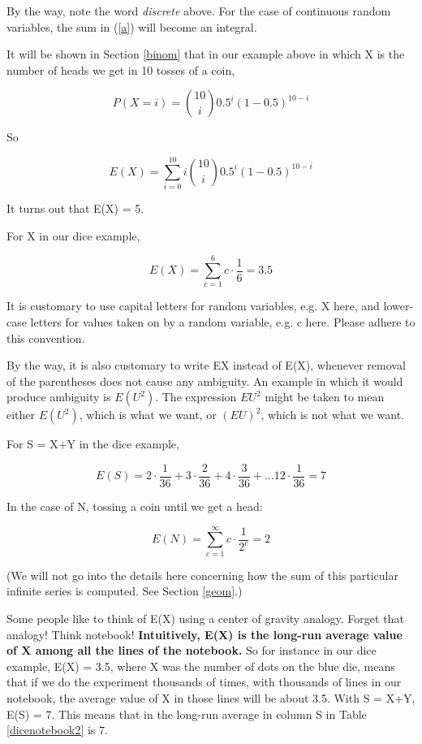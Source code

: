 By the way, note the word {\it discrete} above.  For the case of
continuous random variables, the sum in (\ref{a}) will become an
integral.

It will be shown in Section \ref{binom} that in our example above in
which X is the number of heads we get in 10 tosses of a coin,

\begin{equation}
P(X = i) =  \binom{10}{i} 0.5^i (1-0.5)^{10-i}  
\end{equation}

So

\begin{equation}
E(X) =  \sum_{i=0}^{10} i \binom{10}{i} 0.5^i (1-0.5)^{10-i}  
\end{equation}

It turns out that E(X) = 5.

For X in our dice example, 

\begin{equation}
E(X) = \sum_{c=1}^6 c \cdot \frac{1}{6} = 3.5
\end{equation}

It is customary to use capital letters for random variables, e.g. X
here, and lower-case letters for values taken on by a random variable,
e.g. c here.  Please adhere to this convention.  

By the way, it is also customary to write EX instead of E(X), whenever
removal of the parentheses does not cause any ambiguity.  An example in
which it would produce ambiguity is $E(U^2)$.  The expression $EU^2$
might be taken to mean either $E(U^2)$, which is what we want, or
$(EU)^2$, which is not what we want.

For S = X+Y in the dice example,

\begin{equation}
\label{es}
E(S) = 
2 \cdot \frac{1}{36} +
3 \cdot \frac{2}{36} +
4 \cdot \frac{3}{36} +
...
12 \cdot \frac{1}{36} = 7
\end{equation}

In the case of N, tossing a coin until we get a head:

\begin{equation}
E(N) = \sum_{c=1}^\infty c \cdot \frac{1}{2^c} =  2
\end{equation}

(We will not go into the details here concerning how the sum of this
particular infinite series is computed.  See Section \ref{geom}.)

Some people like to think of E(X) using a center of gravity analogy.
Forget that analogy!  Think notebook!  {\bf Intuitively, E(X) is the
long-run average value of X among all the lines of the notebook.}  So
for instance in our dice example, E(X) = 3.5, where X was the number of
dots on the blue die, means that if we do the experiment thousands of
times, with thousands of lines in our notebook, the average value of X
in those lines will be about 3.5.   With S = X+Y, E(S) = 7.  This means
that in the long-run average in column S in Table \ref{dicenotebook2} is
7.

